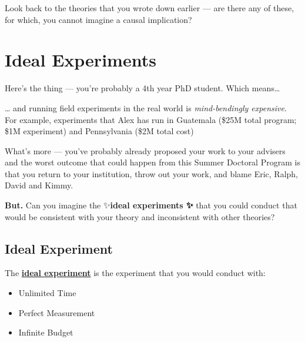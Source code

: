 \documentclass[
  letterpaper,
  DIV=11,
  numbers=noendperiod]{scrreprt}
\begin{document}
\begin{tcolorbox}[enhanced jigsaw, bottomtitle=1mm, coltitle=black, colback=white, colframe=quarto-callout-note-color-frame, title=\textcolor{quarto-callout-note-color}{\faInfo}\hspace{0.5em}{Discussion Question}, opacityback=0, arc=.35mm, titlerule=0mm, leftrule=.75mm, toptitle=1mm, rightrule=.15mm, opacitybacktitle=0.6, colbacktitle=quarto-callout-note-color!10!white, toprule=.15mm, left=2mm, bottomrule=.15mm, breakable]

Look back to the theories that you wrote down earlier --- are there any
of these, for which, you cannot imagine a causal implication?

\end{tcolorbox}


\chapter{Ideal Experiments}\label{ideal-experiments}

Here's the thing --- you're probably a 4th year PhD student. Which
means\ldots{} 💸 👻 🏦

\ldots{} and running field experiments in the real world is
\emph{mind-bendingly expensive}. For example, experiments that Alex has
run in Guatemala (\$25M total program; \$1M experiment) and Pennsylvania
(\$2M total cost)

What's more --- you've probably already proposed your work to your
advisers and the worst outcome that could happen from this Summer
Doctoral Program is that you return to your institution, throw out your
work, and blame Eric, Ralph, David and Kimmy.

\textbf{But.} Can you imagine the ✨\textbf{ideal experiments ✨} that
you could conduct that would be consistent with your theory and
inconsistent with other theories?

\section{Ideal Experiment}\label{ideal-experiment}

The
\href{https://media4.giphy.com/media/v1.Y2lkPTc5MGI3NjExOGxha21yNXV4djg5NXh5bG9uMHpnNmhoOGV1MWt3aXhnM2h3Y3BwMyZlcD12MV9pbnRlcm5hbF9naWZfYnlfaWQmY3Q9dg/RtFGrL8Fn2xutS0qmN/giphy.gif}{\textbf{ideal
experiment}} is the experiment that you would conduct with:

\begin{itemize}
\item
  Unlimited Time
\item
  Perfect Measurement
\item
  Infinite Budget
\end{itemize}
\end{document}
